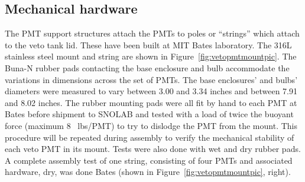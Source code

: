 \documentclass{JINST}
\begin{document}
\subsection{Mechanical hardware}
%
The PMT support structures attach the PMTs to poles or
``strings'' which attach to the veto tank lid.  These  have been built at
MIT Bates laboratory. 
The 316L stainless steel mount and string are shown in
Figure~\ref{fig:vetopmtmountpic}.  The
Buna-N rubber pads contacting the base enclosure and bulb accommodate
the variations in dimensions across the set of PMTs. The base
enclosures' and bulbs' diameters were measured to vary between 3.00
and 3.34 inches and between 7.91 and 8.02 inches. The rubber mounting
pads were all fit by hand to each PMT at Bates before shipment to
SNOLAB and tested with a load of twice the buoyant force (maximum 8
~lbs/PMT) to try to dislodge the PMT from the mount.  This procedure
will be repeated during assembly to verify the mechanical stability of
each veto PMT in its mount.  Tests were also done with wet and dry
rubber pads.  A complete assembly test of one string, consisting of
four PMTs and associated hardware, dry, was done Bates (shown in Figure~\ref{fig:vetopmtmountpic}, right).

%
\end{document}
